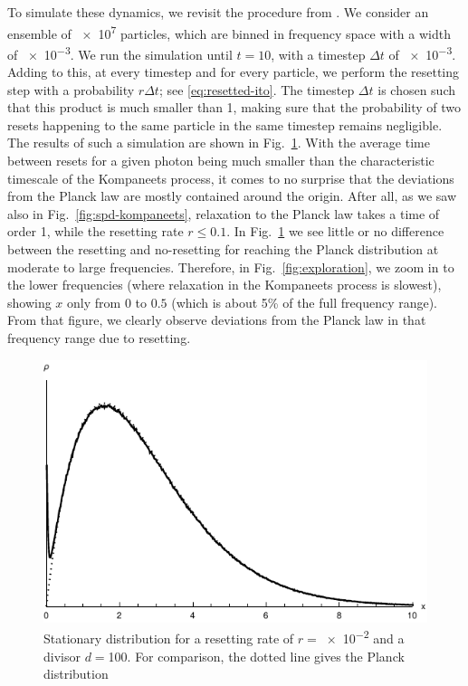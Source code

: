 \documentclass[a4paper,12pt,reqno,superscriptaddress,nofootinbib]{revtex4}
\theoremstyle{plain}
\theoremstyle{definition}
\theoremstyle{remark}
\newcommand{\0}{^{(0)}}
\newcommand{\1}{^{(1)}}
\newcommand{\2}{^{(2)}}
\begin{document}
To simulate these dynamics, we revisit the procedure from \cite{paper2}. We consider an ensemble of \num{e7} particles, which are binned in frequency space with a width of \num{e-3}. We run the simulation until $t = 10$, with a timestep $\Delta t$ of \num{e-3}. Adding to this, at every timestep and for every particle, we perform the resetting step with a probability $r \Delta t$; see \eqref{eq:resetted-ito}. The timestep $\Delta t$ is chosen such  that this product is much smaller than 1, making sure that the probability of two resets happening to the same particle in the same timestep remains negligible.\\

The results of such a simulation are shown in Fig.~\ref{fig:fullplanck}. With the average time between resets for a given photon being much smaller than the characteristic timescale of the Kompaneets process, it comes to no surprise that the deviations from the Planck law are mostly contained around the origin. After all, as we saw also in Fig.~\ref{fig:spd-kompaneets}, relaxation to the Planck law takes a time of order 1, while the resetting rate $r\leq 0.1$. In Fig.~\ref{fig:fullplanck} we see little or no difference between the resetting and no-resetting for reaching the Planck distribution at moderate to large frequencies. Therefore, in Fig.~\ref{fig:exploration}, we zoom in to the lower frequencies (where relaxation in the Kompaneets process is slowest), showing $x$ only from $0$ to $0.5$ (which is about 5\% of the full frequency range). From that figure, we clearly observe deviations from the Planck law in that frequency range due to resetting.\\

\begin{figure}
	\includegraphics{fullplanck.pdf}
	\caption{Stationary distribution for a resetting rate of $r=$\num{e-2} and a divisor $d=$\num{100}. For comparison, the dotted line gives the Planck distribution}\label{fig:fullplanck}
\end{figure}
\end{document}
